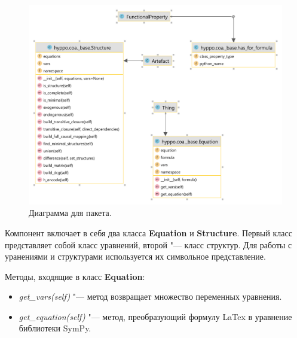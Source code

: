 \begin{figure}[h!]
    \centering
    \includegraphics[width=0.9\linewidth]{images/base_coa.pdf}
    \caption{Диаграмма для пакета.}\label{fig:base_coa}
\end{figure}

Компонент включает в себя два класса \textbf{Equation} и \textbf{Structure}. Первый класс представляет собой класс 
уравнений, второй "--- класс структур. Для работы с уранениями и структурами используется их символьное представление.

Методы, входящие в класс \textbf{Equation}:
\begin{itemize}
    \item \textit{get\_vars(self)} "--- метод возвращает множество переменных уравнения.
    \item \textit{get\_equation(self)} "--- метод, преобразующий формулу LaTex в уравнение библиотеки SymPy.
\end{itemize}

